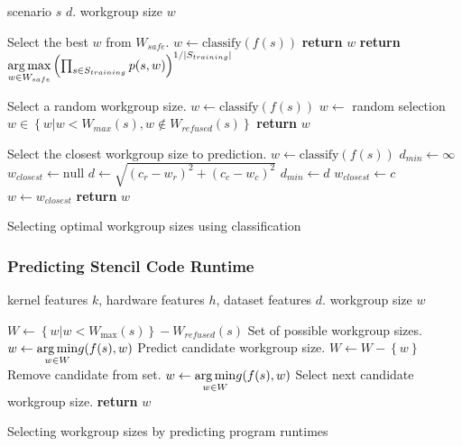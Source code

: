 \documentclass[nonatbib,preprint,11pt]{sigplanconf}
\begin{document}
\begin{algorithm}
\begin{algorithmic}[1]
\Require scenario $s$
$d$.
\Ensure workgroup size $w$

\Comment Select the best $w$ from $W_{safe}$.
\State $w \leftarrow \text{classify}(f(s))$
    \State \textbf{return} $w$
\Else
  \State \textbf{return} $\underset{w \in W_{safe}}{\operatorname*{arg\,max}}
\left(
  \prod_{s \in S_{training}} p(s, w)
\right)^{1/|S_{training}|}$
\EndIf
\EndProcedure
\item[] %

\Comment Select a random workgroup size.
\State $w \leftarrow \text{classify}(f(s))$
  \State $w \leftarrow $ random selection $w \in \left\{ w | w < W_{max}(s), w \not\in W_{refused}(s) \right\}$
\EndWhile
\State \textbf{return} $w$
\EndProcedure
\item[] %

\Comment Select the closest workgroup size to prediction.
\State $w \leftarrow \text{classify}(f(s))$
  \State $d_{min} \leftarrow \infty$
  \State $w_{closest} \leftarrow \text{null}$
    \State $d \leftarrow \sqrt{\left(c_r - w_r\right)^2 + \left(c_c - w_c\right)^2}$
      \State $d_{min} \leftarrow d$
      \State $w_{closest} \leftarrow c$
    \EndIf
  \EndFor
  \State $w \leftarrow w_{closest}$
\EndWhile
\State \textbf{return} $w$
\EndProcedure
\end{algorithmic}
\caption{Selecting optimal workgroup sizes using classification}
\label{alg:autotune-classification}
\end{algorithm}

\subsubsection{Predicting Stencil Code Runtime}

\begin{algorithm}
\begin{algorithmic}[1]
\Require kernel features $k$, hardware features $h$, dataset features
$d$.
\Ensure workgroup size $w$

\State $W \leftarrow \left\{ w | w < W_{\max}(s) \right\} - W_{refused}(s)$
\Comment Set of possible workgroup sizes.
\State $w \leftarrow \underset{w \in W}{\operatorname*{arg\,min}} g(f(s), w)$
\Comment Predict candidate workgroup size.
  \State $W \leftarrow W - \left\{ w \right\}$
  \Comment Remove candidate from set.
  \State $w \leftarrow \underset{w \in W}{\operatorname*{arg\,min}} g(f(s), w)$
  \Comment Select next candidate workgroup size.
\EndWhile
\State \textbf{return} $w$
\end{algorithmic}
\caption{Selecting workgroup sizes by predicting program runtimes}
\label{alg:autotune-runtime-regression}
\end{algorithm}
\end{document}
